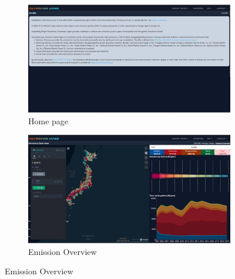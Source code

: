 \begin{figure}[tbh!]
  \centering
  \begin{subfigure}{.5\textwidth}
      \centering
      \includegraphics[width=.9\textwidth]{figs/chap7/home.png}
      \caption{Home page}
  \end{subfigure}%
  \begin{subfigure}{.5\textwidth}
      \centering
      \includegraphics[width=.9\textwidth]{figs/chap7/ems_overview.png}
      \caption{Emission Overview}
      \label{fig:chap7_fig_ems_tracker_a}
  \end{subfigure}


\end{figure}
